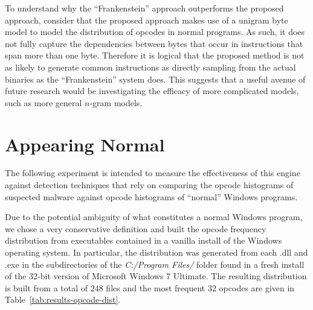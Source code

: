     To understand why the ``Frankenstein'' approach outperforms the proposed
    approach, consider that the proposed approach makes use of a unigram byte
    model to model the distribution of opcodes in normal programs. As such, it
    does not fully capture the dependencies between bytes that occur in
    instructions that span more than one byte. Therefore it is logical that the
    proposed method is not as likely to generate common instructions as directly
    sampling from the actual binaries as the ``Frankenstein'' system does. This
    suggests that a useful avenue of future research would be investigating the
    efficacy of more complicated models, such as more general $n$-gram models.

\section{Appearing Normal}

    The following experiment is intended to measure the effectiveness of
    this engine against detection techniques that rely on comparing the
    opcode histograms of suspected malware against opcode histograms of
    ``normal'' Windows programs.

    Due to the potential ambiguity of what constitutes a normal Windows
    program, we chose a very conservative definition and built the opcode
    frequency distribution from executables contained in a vanilla install
    of the Windows operating system. In particular, the distribution was
    generated from each {.dll} and {.exe} in the subdirectories of the
    \emph{C:/Program Files/} folder found in a fresh install of the 32-bit
    version of Microsoft Windows 7 Ultimate. The resulting distribution is
    built from a total of $248$ files and the most frequent $32$ opcodes are
    given in Table~\ref{tab:results-opcode-dist}.

